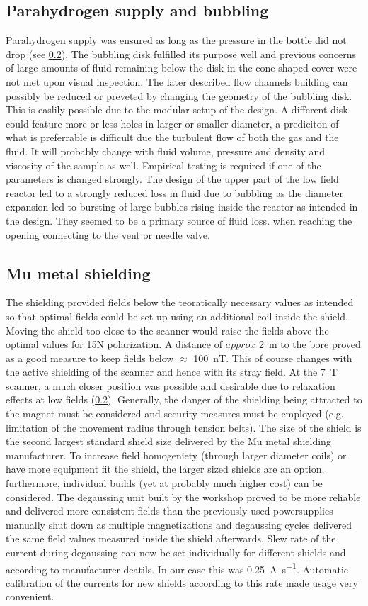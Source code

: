         \subsection{Parahydrogen supply and bubbling}
            Parahydrogen supply was ensured as long as the pressure in the bottle did not drop (see \ref{}). The bubbling disk fulfilled its purpose well and previous concerns of large amounts of fluid remaining below the disk in the cone shaped cover were not met upon visual inspection. The later described flow channels building can possibly be reduced or preveted by changing the geometry of the bubbling disk. This is easlily possible due to the modular setup of the design. A different disk could feature more or less holes in larger or smaller diameter, a prediciton of what is preferrable is difficult due the turbulent flow of both the gas and the fluid. It will probably change with fluid volume, pressure and density and viscosity of the sample as well. Empirical testing is required if one of the parameters is changed strongly.
            The design of the upper part of the low field reactor led to a strongly reduced loss in fluid due to bubbling as the diameter expansion led to bursting of large bubbles rising inside the reactor as intended in the design. They seemed to be a primary source of fluid loss. when reaching the opening connecting to the vent or needle valve.
        \subsection{Mu metal shielding}
            The shielding provided fields below the teoratically necessary values as intended so that optimal fields could be set up using an additional coil inside the shield. Moving the shield too close to the scanner would raise the fields above the optimal values for 15N polarization. A distance of $approx$ \SI{2}{\meter} to the bore proved as a good measure to keep fields below $\approx$ \SI{100}{\nano\tesla}. This of course changes with the active shielding of the scanner and hence with its stray field. At the \SI{7}{\tesla} scanner, a much closer position was possible and desirable due to relaxation effects at low fields (\ref{}). Generally, the danger of the shielding being attracted to the magnet must be considered and security measures must be employed (e.g. limitation of the movement radius through tension belts). The size of the shield is the second largest standard shield size delivered by the Mu metal shielding manufacturer. To increase field homogeniety (through larger diameter coils) or have more equipment fit the shield, the larger sized shields are an option. furthermore, individual builds (yet at probably much higher cost) can be considered.
            The degaussing unit built by the workshop proved to be more reliable and delivered more consistent fields than the previously used powersupplies manually shut down as multiple magnetizations and degaussing cycles delivered the same field values measured inside the shield afterwards. Slew rate of the current during degaussing can now be set individually for different shields and according to manufacturer deatils. In our case this was \SI{0.25}{\ampere\per\second}. Automatic calibration of the currents for new shields according to this rate made usage very convenient.

